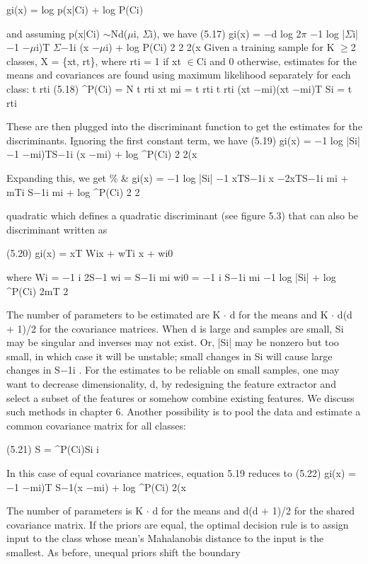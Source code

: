 gi(x) = log p(x|Ci) + log P(Ci)

and assuming p(x|Ci) $\sim$Nd($\mu$i, $\Sigma$i), we have (5.17) gi(x) = $-$d log 2$\pi$ $-$1 log |$\Sigma$i| $-$1 $-$$\mu$i)T $\Sigma$$-$1i (x $-$$\mu$i) + log P(Ci) 2 2 2(x Given a training sample for K $\geq$2 classes, X = \{xt, rt\}, where rti = 1 if xt $\in$Ci and 0 otherwise, estimates for the means and covariances are found using maximum likelihood separately for each class: t rti (5.18) \textasciicircum{}P(Ci) = N t rti xt mi = t rti t rti (xt $-$mi)(xt $-$mi)T Si = t rti

These are then plugged into the discriminant function to get the estimates for the discriminants. Ignoring the first constant term, we have (5.19) gi(x) = $-$1 log |Si| $-$1 $-$mi)TS$-$1i (x $-$mi) + log \textasciicircum{}P(Ci) 2 2(x

Expanding this, we get \% \& gi(x) = $-$1 log |Si| $-$1 xTS$-$1i x $-$2xTS$-$1i mi + mTi S$-$1i mi + log \textasciicircum{}P(Ci) 2 2

quadratic which defines a quadratic discriminant (see figure 5.3) that can also be discriminant written as

(5.20) gi(x) = xT Wix + wTi x + wi0

where Wi = $-$1 i 2S$-$1 wi = S$-$1i mi wi0 = $-$1 i S$-$1i mi $-$1 log |Si| + log \textasciicircum{}P(Ci) 2mT 2

The number of parameters to be estimated are K $\cdot$ d for the means and K $\cdot$ d(d + 1)/2 for the covariance matrices. When d is large and samples are small, Si may be singular and inverses may not exist. Or, |Si| may be nonzero but too small, in which case it will be unstable; small changes in Si will cause large changes in S$-$1i . For the estimates to be reliable on small samples, one may want to decrease dimensionality, d, by redesigning the feature extractor and select a subset of the features or somehow combine existing features. We discuss such methods in chapter 6. Another possibility is to pool the data and estimate a common covariance matrix for all classes:

(5.21) S = \textasciicircum{}P(Ci)Si i

In this case of equal covariance matrices, equation 5.19 reduces to (5.22) gi(x) = $-$1 $-$mi)T S$-$1(x $-$mi) + log \textasciicircum{}P(Ci) 2(x

The number of parameters is K $\cdot$ d for the means and d(d + 1)/2 for the shared covariance matrix. If the priors are equal, the optimal decision rule is to assign input to the class whose mean’s Mahalanobis distance to the input is the smallest. As before, unequal priors shift the boundary

